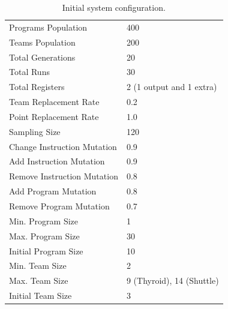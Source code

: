 \documentclass[journal]{IEEEtran}
\begin{document}
\begin{table}[h]
\centering
\captionsetup{justification=centering}
\begin{tabular}{@{}ll@{}}
\toprule
Programs Population & 400 \\
Teams Population    & 200 \\
Total Generations   & 20  \\
Total Runs          & 30 \\
Total Registers          & 2 (1 output and 1 extra) \\
Team Replacement Rate          & 0.2 \\
Point Replacement Rate          & 1.0 \\
Sampling Size          & 120 \\
\midrule
Change Instruction Mutation          & 0.9 \\
Add Instruction Mutation          & 0.9 \\
Remove Instruction Mutation          & 0.8 \\
Add Program Mutation          & 0.8 \\
Remove Program Mutation          & 0.7 \\
\midrule
Min. Program Size          & 	1 \\
Max. Program Size          & 30 \\
Initial Program Size          & 10 \\
\midrule
Min. Team Size          &  2 \\
Max. Team Size          & 9 (Thyroid), 14 (Shuttle) \\
Initial Team Size          & 3 \\
\bottomrule
\end{tabular}
\caption{Initial system configuration.}
\label{table:initial_config}
\end{table}
\end{document}
